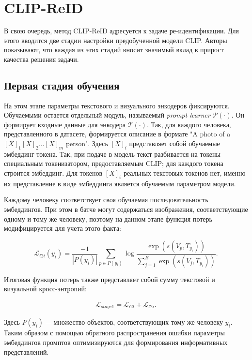 \section{CLIP-ReID}

В свою очередь, метод CLIP-ReID адресуется к задаче ре-идентификации. Для этого вводится две стадии настройки предобученной модели CLIP. Авторы показывают, что каждая из этих стадий вносит значимый вклад в прирост качества решения задачи.

\subsection{Первая стадия обучения}

На этом этапе параметры текстового и визуального энкодеров фиксируются. Обучаемыми остается отдельный модуль, называемый \textit{prompt learner} $\mathcal P(\cdot)$. Он формирует входные данные для энкодера $\mathcal T(\cdot)$. Так, для каждого человека, представленного в датасете, формируется описание в формате "A photo of a $[X]_1[X]_2\dots[X]_m$ person". Здесь $[X]_i$ представляет собой обучаемые эмбеддинг токена. Так, при подаче в модель текст разбивается на токены специальным токенизатором, предоставляемым CLIP; для каждого токена строится эмбеддинг. Для токенов $[X]_i$ реальных текстовых токенов нет, именно их представление в виде эмбеддинга является обучаемым параметром модели. 

Каждому человеку соответствует своя обучаемая последовательность эмбеддингов. При этом в батче могут содержаться изображения, соответствующие одному и тому же человеку, поэтому на данном этапе функция потерь модифицируется для учета этого факта:

\begin{equation}\label{eq:Lt2i}
	\mathcal L_{t2i}(y_i) = \frac{-1}{|P(y_i)|} \sum \limits_{p \in P(y_i)} \log \frac{\exp \left( s(V_p, T_{y_i}) \right)}{\sum_{j = 1}^B \exp \left( s(V_j, T_{y_i}) \right)}.
\end{equation}

Итоговая функция потерь также представляет собой сумму текстовой и визуальной кросс-энтропий:

\begin{eqnarray}
	\mathcal L_{stage1} = \mathcal L_{i2t} + \mathcal L_{t2i}.
\end{eqnarray}

Здесь $P(y_i)$ $-$ множество объектов, соответствующих тому же человеку $y_i$. Таким образом с помощью обратного распространения ошибки параметры эмбеддингов промптов оптимизируются для формирования информативных представлений.

